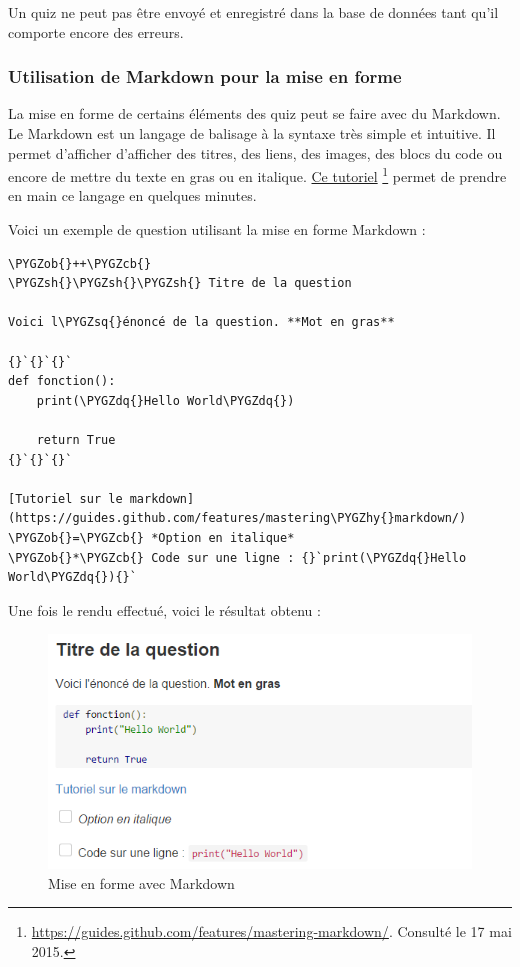 \documentclass[a4,10pt,french]{sphinxmanual}
\def\PYGZob{\char`\{}
\def\PYGZcb{\char`\}}
\def\PYGZsh{\char`\#}
\def\PYGZhy{\char`\-}
\def\PYGZsq{\char`\'}
\def\PYGZdq{\char`\"}
\renewcommand\PYGZsq{\textquotesingle}
\begin{document}
Un quiz ne peut pas être envoyé et enregistré dans la base de données tant qu'il comporte encore des erreurs.


\subsubsection{Utilisation de Markdown pour la mise en forme}
\label{doc-user:utilisation-de-markdown-pour-la-mise-en-forme}
La mise en forme de certains éléments des quiz peut se faire avec du Markdown. Le Markdown est un langage de balisage à la syntaxe très
simple et intuitive. Il permet d'afficher d'afficher des titres, des liens, des images, des blocs du code ou encore de mettre du texte en gras ou en italique.
\href{https://guides.github.com/features/mastering-markdown/}{Ce tutoriel} \footnote{
\href{https://guides.github.com/features/mastering-markdown/}{https://guides.github.com/features/mastering-markdown/}. Consulté le 17 mai 2015.
} permet de prendre en main ce langage en quelques minutes.

Voici un exemple de question utilisant la mise en forme Markdown :

\begin{Verbatim}[commandchars=\\\{\}]
\PYGZob{}++\PYGZcb{}
\PYGZsh{}\PYGZsh{}\PYGZsh{} Titre de la question

Voici l\PYGZsq{}énoncé de la question. **Mot en gras**

{}`{}`{}`
def fonction():
    print(\PYGZdq{}Hello World\PYGZdq{})

    return True
{}`{}`{}`

[Tutoriel sur le markdown](https://guides.github.com/features/mastering\PYGZhy{}markdown/)
\PYGZob{}=\PYGZcb{} *Option en italique*
\PYGZob{}*\PYGZcb{} Code sur une ligne : {}`print(\PYGZdq{}Hello World\PYGZdq{}){}`
\end{Verbatim}

Une fois le rendu effectué, voici le résultat obtenu :
\begin{figure}[htbp]
\centering
\capstart

\includegraphics[width=0.800\linewidth]{markdown.png}
\caption{Mise en forme avec Markdown}\end{figure}
\end{document}
